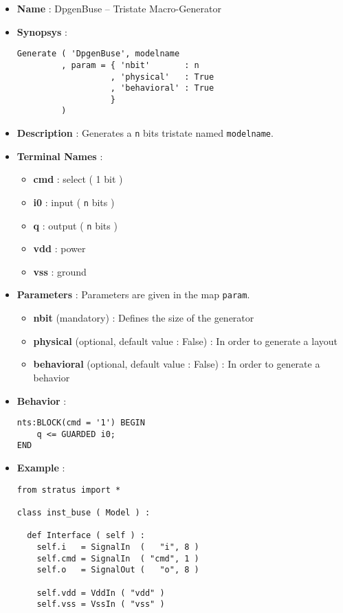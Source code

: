\begin{itemize}
    \item \textbf{Name} : DpgenBuse -- Tristate Macro-Generator
    \item \textbf{Synopsys} :
\begin{verbatim}
Generate ( 'DpgenBuse', modelname
         , param = { 'nbit'       : n
                   , 'physical'   : True
                   , 'behavioral' : True         
                   }
         )
\end{verbatim}
    \item \textbf{Description} : Generates a \verb-n- bits tristate named \verb-modelname-.
    \item \textbf{Terminal Names} :
    \begin{itemize}
        \item \textbf{cmd} : select ( 1 bit )
        \item \textbf{i0} : input ( \verb-n- bits )
        \item \textbf{q} : output ( \verb-n- bits )
        \item \textbf{vdd} : power
        \item \textbf{vss} : ground
    \end{itemize}
    \item \textbf{Parameters} : Parameters are given in the map \verb-param-.
    \begin{itemize}
        \item \textbf{nbit} (mandatory) : Defines the size of the generator
        \item \textbf{physical} (optional, default value : False) : In order to generate a layout
        \item \textbf{behavioral} (optional, default value : False) : In order to generate a behavior        
    \end{itemize}
    \item \textbf{Behavior} :
\begin{verbatim}
nts:BLOCK(cmd = '1') BEGIN
    q <= GUARDED i0;
END
\end{verbatim}
    \item \textbf{Example} :
\begin{verbatim}
from stratus import *

class inst_buse ( Model ) :

  def Interface ( self ) :
    self.i   = SignalIn  (   "i", 8 )
    self.cmd = SignalIn  ( "cmd", 1 )
    self.o   = SignalOut (   "o", 8 )

    self.vdd = VddIn ( "vdd" )
    self.vss = VssIn ( "vss" )
    

\end{verbatim}
\end{itemize}
